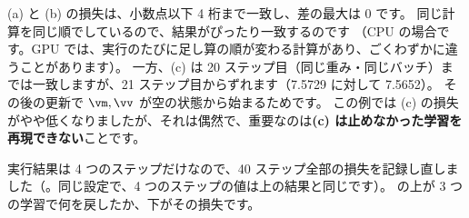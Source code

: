 
(a) と (b) の損失は、小数点以下 4 桁まで一致し、差の最大は 0 です。
同じ計算を同じ順でしているので、結果がぴったり一致するのです
（CPU の場合です。GPU では、実行のたびに足し算の順が変わる計算があり、ごくわずかに違うことがあります）。
一方、(c) は 20 ステップ目（同じ重み・同じバッチ）までは一致しますが、21 ステップ目からずれます（7.5729 に対して 7.5652）。
その後の更新で $\vm, \vv$ が空の状態から始まるためです。
この例では (c) の損失がやや低くなりましたが、それは偶然で、重要なのは\textbf{(c) は止めなかった学習を再現できない}ことです。

実行結果は 4 つのステップだけなので、40 ステップ全部の損失を記録し直しました（。同じ設定で、4 つのステップの値は上の結果と同じです）。
の上が 3 つの学習で何を戻したか、下がその損失です。

